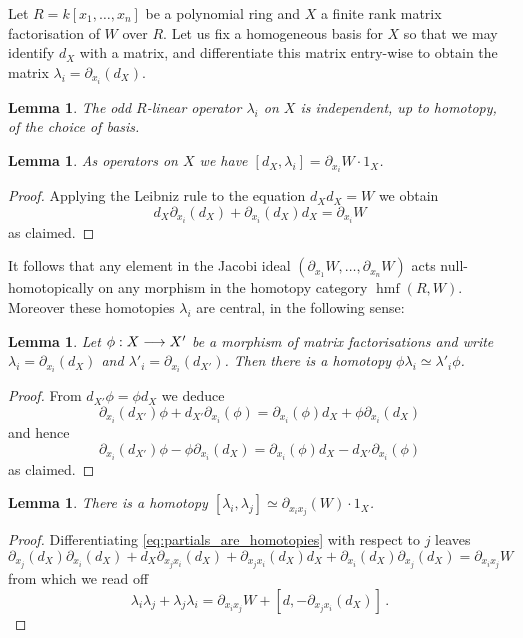 \documentclass[english,letter paper,12pt,leqno]{article}
\newtheorem{lemma}[theorem]{Lemma}
\theoremstyle{example}
\numberwithin{equation}{section}
\def\be{\begin{equation}}
\def\ee{\end{equation}}
\DeclareMathOperator{\hmf}{hmf}
\begin{document}
Let $R = k[x_1,\ldots,x_n]$ be a polynomial ring and $X$ a finite rank matrix factorisation of $W$ over $R$. Let us fix a homogeneous basis for $X$ so that we may identify $d_X$ with a matrix, and differentiate this matrix entry-wise to obtain the matrix $\lambda_i = \partial_{x_i}(d_X)$.

\begin{lemma} The odd $R$-linear operator $\lambda_i$ on $X$ is independent, up to homotopy, of the choice of basis.
\end{lemma}

\begin{lemma} As operators on $X$ we have $[ d_X, \lambda_i ] = \partial_{x_i} W \cdot 1_X$.
\end{lemma}
\begin{proof}
Applying the Leibniz rule to the equation $d_X d_X = W$ we obtain
\be\label{eq:partials_are_homotopies}
d_X \partial_{x_i}(d_X) + \partial_{x_i}(d_X) d_X = \partial_{x_i} W
\ee
as claimed.
\end{proof}

It follows that any element in the Jacobi ideal $( \partial_{x_1}W , \ldots, \partial_{x_n} W )$ acts null-homotopically on any morphism in the homotopy category $\hmf(R,W)$. Moreover these homotopies $\lambda_i$ are central, in the following sense:

\begin{lemma}\label{lemma:naturalityoflambda} Let $\phi: X \longrightarrow X'$ be a morphism of matrix factorisations and write $\lambda_i = \partial_{x_i}(d_X)$ and $\lambda'_i = \partial_{x_i}(d_{X'})$. Then there is a homotopy $\phi \lambda_i \simeq \lambda'_i \phi$.
\end{lemma}
\begin{proof}
From $d_{X'} \phi = \phi d_X$ we deduce
\[
\partial_{x_i}( d_{X'} ) \phi + d_{X'} \partial_{x_i}( \phi ) = \partial_{x_i}( \phi ) d_X + \phi \partial_{x_i}( d_X )
\]
and hence
\[
\partial_{x_i}( d_{X'} ) \phi - \phi \partial_{x_i}( d_X ) = \partial_{x_i}(\phi) d_X - d_{X'} \partial_{x_i}(\phi)
\]
as claimed.
\end{proof}

\begin{lemma}\label{lemma:commutator_of_lambdas} There is a homotopy $[ \lambda_i, \lambda_j ] \simeq \partial_{x_i x_j}(W) \cdot 1_X$.
\end{lemma}
\begin{proof}
Differentiating \eqref{eq:partials_are_homotopies} with respect to $j$ leaves
\[
\partial_{x_j}(d_X) \partial_{x_i}(d_X) + d_X \partial_{x_jx_i}(d_X) + \partial_{x_jx_i}(d_X) d_X + \partial_{x_i}(d_X) \partial_{x_j}(d_X) = \partial_{x_ix_j}W
\]
from which we read off
\[
\lambda_i \lambda_j + \lambda_j \lambda_i = \partial_{x_ix_j}W + [d, -\partial_{x_jx_i}(d_X)]\,.
\]
\end{proof}
\end{document}
